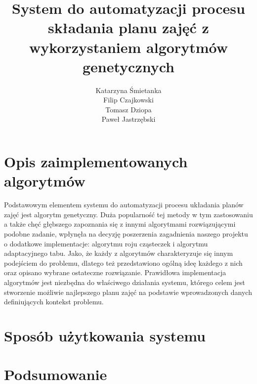 \documentclass[11pt]{report}
\title{System do automatyzacji procesu składania planu zajęć z wykorzystaniem algorytmów genetycznych}
\author{
	Katarzyna Śmietanka \\
	Filip Czajkowski \\
	Tomasz Dziopa\\
	Paweł Jastrzębski
}
\begin{document}
%
%

\maketitle
\tableofcontents











\chapter{Opis zaimplementowanych algorytmów}
\label{algorytmy}
\par Podstawowym elementem systemu do automatyzacji procesu układania planów zajęć jest algorytm genetyczny. Duża popularność tej metody w tym zastosowaniu a także chęć głębszego zapoznania się z innymi algorytmami rozwiązującymi podobne zadanie, wpłynęła na decyzję poszerzenia zagadnienia naszego projektu o dodatkowe implementacje: algorytmu roju cząsteczek i algorytmu adaptacyjnego tabu. 
Jako, że każdy z algorytmów charakteryzuje się innym podejściem do problemu, dlatego też przedstawiono ogólną ideę każdego z nich oraz opisano wybrane ostateczne rozwiązanie. Prawidłowa implementacja algorytmów jest niezbędna do właściwego działania systemu, którego celem jest stworzenie możliwie najlepszego planu zajęć na podstawie wprowadzonych danych definiujących kontekst problemu.








\chapter{Sposób użytkowania systemu}

\chapter{Podsumowanie}

\end{document}
